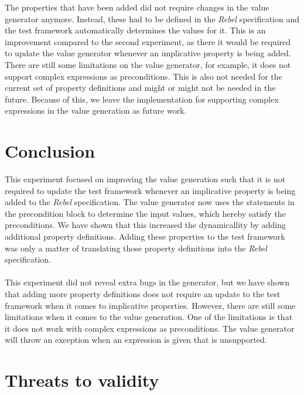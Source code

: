 The properties that have been added did not require changes in the value
generator anymore. Instead, these had to be defined in the \textit{Rebel}
specification and the test framework automatically determines the values for it.
This is an improvement compared to the second experiment, as there it would be
required to update the value generator whenever an implicative property is being
added. There are still some limitations on the value generator, for example, it
does not support complex expressions as preconditions. This is also not needed
for the current set of property definitions and might or might not be needed in
the future. Because of this, we leave the implementation for supporting complex
expressions in the value generation as future work.

\section{Conclusion}
This experiment focused on improving the value generation such that it is not
required to update the test framework whenever an implicative property is being
added to the \textit{Rebel} specification. The value generator now uses the
statements in the precondition block to determine the input values, which hereby
satisfy the preconditions. We have shown that this increased the dynamicallity
by adding additional property definitions. Adding these properties to the test
framework was only a matter of translating those property definitions into the
\textit{Rebel} specification.\\
\\
This experiment did not reveal extra bugs in the generator, but we have shown
that adding more property definitions does not require an update to the test
framework when it comes to implicative properties. However, there are still some
limitations when it comes to the value generation. One of the limitations is
that it does not work with complex expressions as preconditions. The value
generator will throw an exception when an expression is given that is
unsupported.

\section{Threats to validity}

